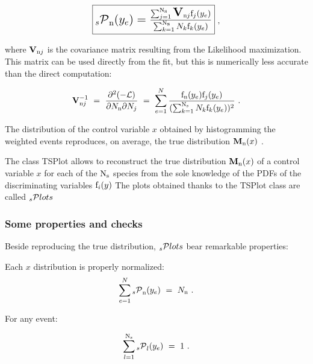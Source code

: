 \documentclass[11pt]{article}
\begin{document}
 \begin{equation}
\begin{Large}\fbox{$
{_s{\cal P}}_{\rm n}(y_e)={\sum_{j=1}^{{\rm N}_{\rm s}} \hbox{\bf V}_{{\rm n}j}{\rm f}_j(y_e)\over\sum_{k=1}^{{\rm N}_{\rm s}}N_k{\rm f}_k(y_e) } $}\end{Large} ~,
\end{equation}
 

where $\hbox{\bf V}_{{\rm n}j}$ is the covariance matrix resulting from the Likelihood maximization.
This matrix can be used directly from the fit, but this is numerically
less accurate than the direct computation:

 \begin{equation}
\hbox{\bf V}^{-1}_{{\rm n}j}~=~
{\partial^2(-{\cal L})\over\partial N_{\rm n}\partial N_j}~=~
\sum_{e=1}^N {{\rm f}_{\rm n}(y_e){\rm f}_j(y_e)\over(\sum_{k=1}^{{\rm N}_{\rm s}}N_k{\rm f}_k(y_e))^2} ~.
\end{equation}


The distribution of the control variable $x$ obtained by histogramming the weighted events reproduces, on average, the true distribution ${\hbox{\bf {M}}}_{\rm n}(x)$ .



The class TSPlot allows to reconstruct the true distribution 
${\hbox{\bf {M}}}_{\rm n}(x)$ of a control variable $x$ for each of the 
${\rm N}_{\rm s}$ species from the sole knowledge of the PDFs of the discriminating variables ${\rm f}_i(y)$  The plots obtained thanks to the TSPlot class are called 
 $\hbox{$_s$}{\cal P}lots$
 


\subsubsection{Some properties and checks}




Beside reproducing the true distribution, 
$\hbox {$_s$}{\cal P}lots$ bear remarkable properties:


Each $x$ distribution is properly normalized:
 \begin{equation}
\sum_{e=1}^{N} {_s{\cal P}}_{\rm n}(y_e)~=~N_{\rm n}~.
\end{equation}
 
For any event:

 \begin{equation}
\sum_{l=1}^{{\rm N}_{\rm s}} {_s{\cal P}}_l(y_e) ~=~1 ~.
\end{equation}
\end{document}

